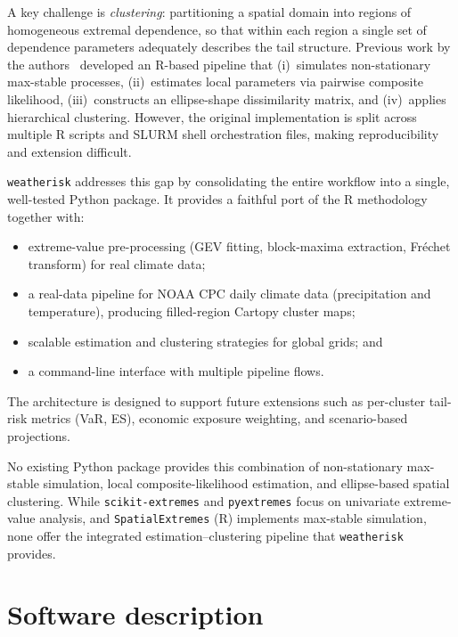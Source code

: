 \documentclass[a4paper]{elsarticle}
\begin{document}
A key challenge is \emph{clustering}: partitioning a spatial domain
into regions of homogeneous extremal dependence, so that within each
region a single set of dependence parameters adequately describes the
tail structure.
Previous work by the authors~\cite{justus2024} developed an R-based
pipeline that
(i)~simulates non-stationary max-stable processes,
(ii)~estimates local parameters via pairwise composite likelihood,
(iii)~constructs an ellipse-shape dissimilarity matrix, and
(iv)~applies hierarchical clustering.
However, the original implementation is split across multiple R scripts
and SLURM shell orchestration files, making reproducibility and
extension difficult.

\texttt{weatherisk} addresses this gap by consolidating the entire
workflow into a single, well-tested Python package.
It provides a faithful port of the R methodology together with:
\begin{itemize}
\item extreme-value pre-processing (GEV fitting, block-maxima
  extraction, Fr\'{e}chet transform) for real climate data;
\item a real-data pipeline for NOAA CPC daily climate data
  (precipitation and temperature), producing filled-region
  Cartopy cluster maps;
\item scalable estimation and clustering strategies for global
  grids; and
\item a command-line interface with multiple pipeline flows.
\end{itemize}

The architecture is designed to support future extensions such as
per-cluster tail-risk metrics (VaR, ES), economic exposure weighting,
and scenario-based projections.

No existing Python package provides this combination of non-stationary
max-stable simulation, local composite-likelihood estimation, and
ellipse-based spatial clustering.
While \texttt{scikit-extremes} and \texttt{pyextremes} focus on
univariate extreme-value analysis, and \texttt{SpatialExtremes} (R)
implements max-stable simulation, none offer the integrated
estimation--clustering pipeline that \texttt{weatherisk} provides.

\section{Software description}
\label{sec:description}
\end{document}
